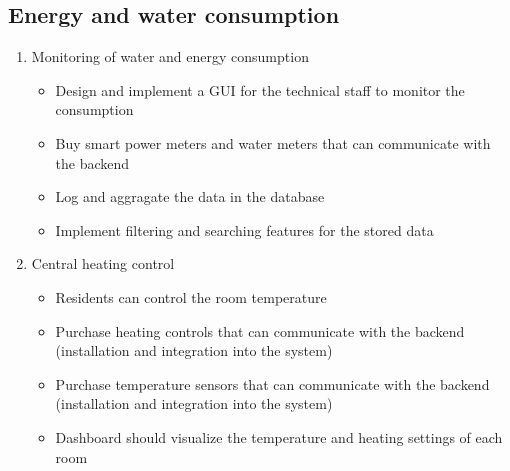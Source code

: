 \subsection{Energy and water consumption}
\label{sec:orged4964c}
\begin{enumerate}
\item Monitoring of water and energy consumption
\label{sec:org2364917}
\begin{itemize}
\item Design and implement a GUI for the technical staff to monitor the consumption
\item Buy smart power meters and water meters that can communicate with the backend
\item Log and aggragate the data in the database
\item Implement filtering and searching features for the stored data
\end{itemize}
\item Central heating control
\label{sec:org2012d7b}
\begin{itemize}
\item Residents can control the room temperature
\item Purchase heating controls that can communicate with the backend (installation and integration into  the system)
\item Purchase temperature sensors that can communicate with the backend (installation and integration into  the system)
\item Dashboard should visualize the temperature and heating settings of each room
\end{itemize}
\end{enumerate}
